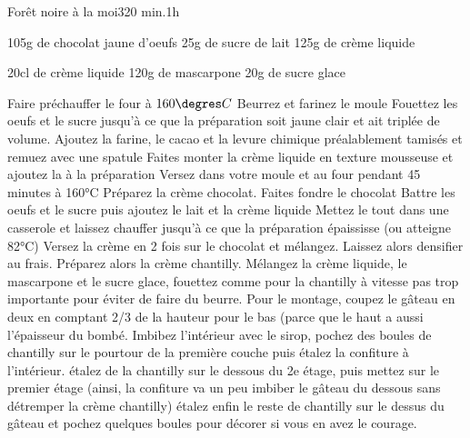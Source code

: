 {\begin{recette}{Forêt noire à la moi}{3}{20 min.}{1h}
\begin{ingredients}
\ingredient 105g de chocolat
 jaune d'oeufs
\ingredient 25g de sucre
 de lait
\ingredient 125g de crème liquide

\ingredient 20cl de crème liquide
\ingredient 120g de mascarpone
\ingredient 20g de sucre glace

\end{ingredients}

\begin{preparation}
\etape Faire préchauffer le four à $160\degres C$
\etape Beurrez et farinez le moule
\etape Fouettez les oeufs et le sucre jusqu'à ce que la préparation soit jaune clair et ait triplée de volume.
\etape Ajoutez la farine, le cacao et la levure chimique préalablement tamisés et remuez avec une spatule
\etape Faites monter la crème liquide en texture mousseuse et ajoutez la à la préparation
\etape Versez dans votre moule et au four pendant 45 minutes à 160°C
\etape [facultatif] Préparez la crème chocolat. 
\etape Faites fondre le chocolat
\etape Battre les oeufs et le sucre puis ajoutez le lait et la crème liquide
\etape Mettez le tout dans une casserole et laissez chauffer jusqu'à ce que la préparation épaississe (ou atteigne 82°C)
\etape Versez la crème en 2 fois sur le chocolat et mélangez. Laissez alors densifier au frais.
\etape Préparez alors la crème chantilly. Mélangez la crème liquide, le mascarpone et le sucre glace, fouettez comme pour la chantilly à vitesse pas trop importante pour éviter de faire du beurre.
\etape Pour le montage, coupez le gâteau en deux en comptant 2/3 de la hauteur pour le bas (parce que le haut a aussi l'épaisseur du bombé.
Imbibez l'intérieur avec le sirop, pochez des boules de chantilly sur le pourtour de la première couche puis étalez la confiture à l'intérieur.
\etape étalez de la chantilly sur le dessous du 2e étage, puis mettez sur le premier étage (ainsi, la confiture va un peu imbiber le gâteau du dessous sans détremper la crème chantilly)
\etape étalez enfin le reste de chantilly sur le dessus du gâteau et pochez quelques boules pour décorer si vous en avez le courage.

\end{preparation}

\begin{cuisson}

\end{cuisson}
\end{recette}

}
